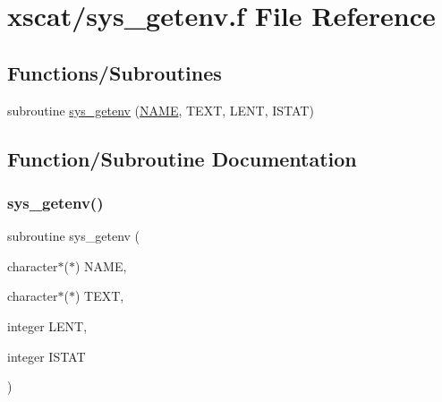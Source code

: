 \hypertarget{xscat_2sys__getenv_8f}{}\section{xscat/sys\+\_\+getenv.f File Reference}
\label{xscat_2sys__getenv_8f}
\subsection*{Functions/\+Subroutines}
\begin{DoxyCompactItemize}
\item 
subroutine \hyperlink{xscat_2sys__getenv_8f_aca2c6679545619d1cedc82daed32a87a}{sys\+\_\+getenv} (\hyperlink{inflate_8h_a164ea0159d5f0b5f12a646f25f99eceaa67bc2ced260a8e43805d2480a785d312}{N\+A\+ME}, T\+E\+XT, L\+E\+NT, I\+S\+T\+AT)
\end{DoxyCompactItemize}


\subsection{Function/\+Subroutine Documentation}
\mbox{\label{xscat_2sys__getenv_8f_aca2c6679545619d1cedc82daed32a87a}} 
\subsubsection{\texorpdfstring{sys\+\_\+getenv()}{sys\_getenv()}}
{\footnotesize\ttfamily subroutine sys\+\_\+getenv (\begin{DoxyParamCaption}\item[{character$\ast$($\ast$)}]{N\+A\+ME,  }\item[{character$\ast$($\ast$)}]{T\+E\+XT,  }\item[{integer}]{L\+E\+NT,  }\item[{integer}]{I\+S\+T\+AT }\end{DoxyParamCaption})}

